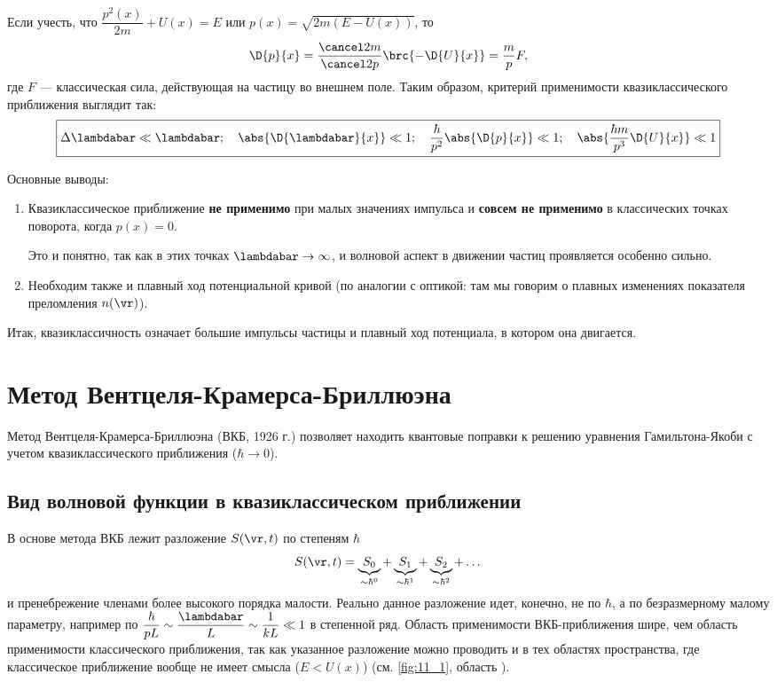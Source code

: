 Если учесть, что $\dfrac{p^2(x)}{2m} + U(x) = E$ или $p(x)=\sqrt{2m(E-U(x))}$, то 
$$
\D{p}{x}=\frac{\cancel 2m}{\cancel 2 p}\brc{-\D{U}{x}} = \frac{m}{p}F,
$$
где $F$ --- классическая сила, действующая на частицу во внешнем поле. Таким образом, критерий применимости квазиклассического приближения выглядит так:
$$
\boxed{\Delta \lambdabar \ll \lambdabar;~~~\abs{\D{\lambdabar}{x}} \ll 1;~~~\frac{\hbar}{p^2} \abs{\D{p}{x}} \ll 1; ~~~\abs{\frac{\hbar m}{p^3} \D{U}{x}} \ll 1 }
$$

Основные выводы:

\begin{enumerate}
\item Квазиклассическое приближение {\bf не применимо} при малых значениях импульса и {\bf совсем не применимо} в классических точках поворота, когда $p(x)=0$. 

Это и понятно, так как в этих точках $\lambdabar \to \infty$, и волновой аспект в движении частиц проявляется особенно сильно.
\item Необходим также и плавный ход потенциальной кривой (по аналогии с оптикой: там мы говорим о плавных изменениях показателя преломления $n(\vr)$).
\end{enumerate}

Итак, квазиклассичность означает большие импульсы частицы и плавный ход потенциала, в котором она двигается. 

\section{Метод Вентцеля-Крамерса-Бриллюэна}

Метод Вентцеля-Крамерса-Бриллюэна\footnotemark{} (ВКБ, 1926 г.) позволяет находить квантовые поправки к решению уравнения Гамильтона-Якоби с учетом квазиклассического приближения ($\hbar \to 0$).

 
\subsection{Вид волновой функции в квазиклассическом приближении}

В основе метода ВКБ лежит разложение $S(\vr,t)$ по степеням $\hbar$
$$
S(\vr,t) = \underbrace{S_0}_{\sim \hbar^0}
         + \underbrace{S_1}_{\sim \hbar^1}
         + \underbrace{S_2}_{\sim \hbar^2} + \dots
$$%
%
и пренебрежение членами более высокого порядка малости. Реально данное разложение идет, конечно, не по $\hbar$, а по безразмерному малому параметру, например по $\dfrac{\hbar}{pL} \sim \dfrac{\lambdabar}{L} \sim \dfrac{1}{kL} \ll 1$ в степенной ряд. Область применимости ВКБ-приближения шире, чем область применимости классического приближения, так как указанное разложение можно проводить и в тех областях пространства, где классическое приближение вообще не имеет смысла ($E < U(x)$) (см. \autoref{fig:11_1}, область ).

